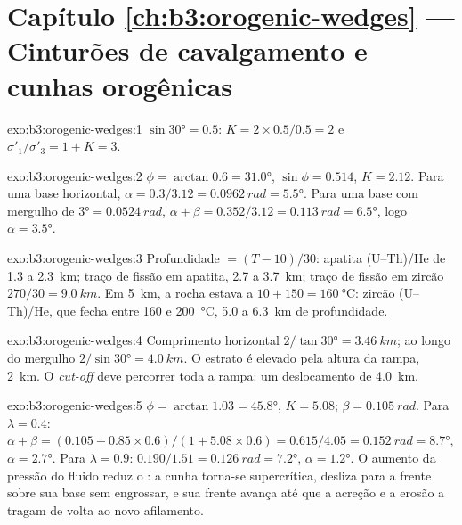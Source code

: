 \section*{Capítulo \ref{ch:b3:orogenic-wedges} --- Cinturões de cavalgamento e cunhas orogênicas}

\begin{solution}{exo:b3:orogenic-wedges:1}
$\sin\ang{30} = 0.5$: $K = 2\times0.5/0.5 = 2$ e $\sigma'_1/\sigma'_3 = 1 +
K = 3$.
\end{solution}

\begin{solution}{exo:b3:orogenic-wedges:2}
$\phi = \arctan0.6 = \ang{31.0}$, $\sin\phi = 0.514$, $K = 2.12$. Para uma
base horizontal, $\alpha = 0.3/3.12 = \qty{0.0962}{rad} = \ang{5.5}$. Para uma
base com mergulho de $\ang{3} = \qty{0.0524}{rad}$, $\alpha + \beta = 0.352/3.12 =
\qty{0.113}{rad} = \ang{6.5}$, logo $\alpha = \ang{3.5}$.
\end{solution}

\begin{solution}{exo:b3:orogenic-wedges:3}
Profundidade $= (T - 10)/30$: apatita (U--Th)/He de 1.3 a \qty{2.3}{km}; traço de fissão em
apatita, 2.7 a \qty{3.7}{km}; traço de fissão em zircão $270/30 = \qty{9.0}{km}$. Em
\qty{5}{km}, a rocha estava a $10 + 150 = \qty{160}{\celsius}$: zircão
(U--Th)/He, que fecha entre 160 e \qty{200}{\celsius}, 5.0 a
\qty{6.3}{km} de profundidade.
\end{solution}

\begin{solution}{exo:b3:orogenic-wedges:4}
Comprimento horizontal $2/\tan\ang{30} = \qty{3.46}{km}$; ao longo do mergulho
$2/\sin\ang{30} = \qty{4.0}{km}$. O estrato é elevado pela altura da rampa,
\qty{2}{km}. O \textit{cut-off} deve percorrer toda a rampa: um deslocamento de
\qty{4.0}{km}.
\end{solution}

\begin{solution}{exo:b3:orogenic-wedges:5}
$\phi = \arctan1.03 = \ang{45.8}$, $K = 5.08$; $\beta = \qty{0.105}{rad}$.
Para $\lambda = 0.4$: $\alpha + \beta = (0.105 + 0.85\times0.6)/(1 +
5.08\times0.6) = 0.615/4.05 = \qty{0.152}{rad} = \ang{8.7}$, $\alpha =
\ang{2.7}$. Para $\lambda = 0.9$: $0.190/1.51 = \qty{0.126}{rad} = \ang{7.2}$,
$\alpha = \ang{1.2}$. O aumento da pressão do fluido reduz o :
a cunha torna-se supercrítica, desliza para a frente sobre sua base sem
engrossar, e sua frente avança até que a acreção e a erosão a tragam de volta
ao novo afilamento.
\end{solution}

